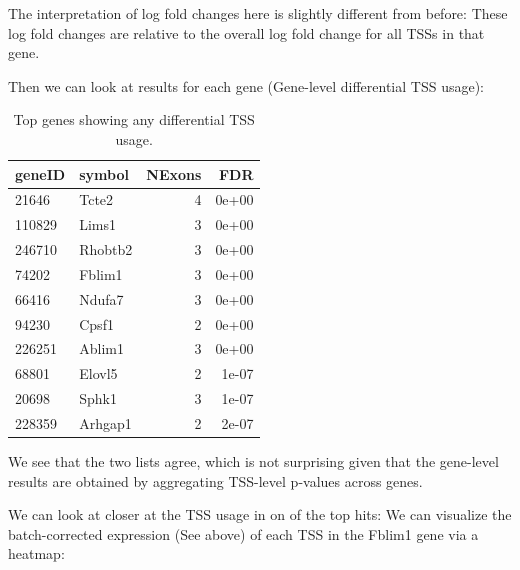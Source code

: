 \documentclass[9pt,a4paper,]{extarticle}
\newenvironment{Shaded}{\begin{snugshade}}{\end{snugshade}}
\newcommand{\KeywordTok}[1]{\textcolor[rgb]{0.13,0.29,0.53}{\textbf{{#1}}}}
\newcommand{\DataTypeTok}[1]{\textcolor[rgb]{0.13,0.29,0.53}{{#1}}}
\newcommand{\StringTok}[1]{\textcolor[rgb]{0.31,0.60,0.02}{{#1}}}
\newcommand{\OtherTok}[1]{\textcolor[rgb]{0.56,0.35,0.01}{{#1}}}
\newcommand{\NormalTok}[1]{{#1}}
\begin{document}
The interpretation of log fold changes here is slightly different from before: These log fold changes are relative to the overall log fold change for all TSSs in that gene.

Then we can look at results for each gene (Gene-level differential TSS usage):

\begin{Shaded}
\end{Shaded}

\begin{table}[t]

\caption{\label{tab:dtuGene}Top genes showing any differential TSS usage.}
\centering
\begin{tabular}{l|l|r|r}
\hline
geneID & symbol & NExons & FDR\\
\hline
21646 & Tcte2 & 4 & 0e+00\\
\hline
110829 & Lims1 & 3 & 0e+00\\
\hline
246710 & Rhobtb2 & 3 & 0e+00\\
\hline
74202 & Fblim1 & 3 & 0e+00\\
\hline
66416 & Ndufa7 & 3 & 0e+00\\
\hline
94230 & Cpsf1 & 2 & 0e+00\\
\hline
226251 & Ablim1 & 3 & 0e+00\\
\hline
68801 & Elovl5 & 2 & 1e-07\\
\hline
20698 & Sphk1 & 3 & 1e-07\\
\hline
228359 & Arhgap1 & 2 & 2e-07\\
\hline
\end{tabular}
\end{table}

We see that the two lists agree, which is not surprising given that the gene-level results are obtained by aggregating TSS-level p-values across genes.

We can look at closer at the TSS usage in on of the top hits: We can visualize the batch-corrected expression (See above) of each TSS in the Fblim1 gene via a heatmap:
\end{document}
